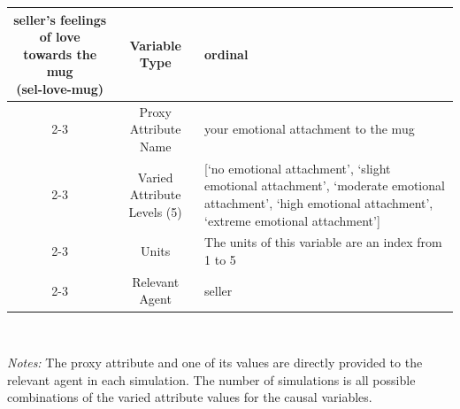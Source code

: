 \documentclass[12pt]{article}
\begin{document}
\begin{table}[ht]
\begin{tabularx}{\textwidth}{|c|c|X|}
\hline
\multirow{5}{*}{\parbox{5cm} { \centering seller's feelings of love towards the mug \\(sel-love-mug)}} & Variable Type & ordinal  \\ \cline{2-3}
                        & Proxy Attribute Name   & your emotional attachment to the mug   \\ \cline{2-3}
                        & Varied Attribute Levels (5)  & [`no emotional attachment', `slight emotional attachment', `moderate emotional attachment', `high emotional attachment', `extreme emotional attachment']   \\ \cline{2-3}
                        & Units  & The units of this variable are an index from 1 to 5   \\ \cline{2-3}
                        & Relevant Agent   & seller   \\ \hline
\end{tabularx}\\
    \begin{minipage}{\textwidth}
    \begin{footnotesize}
      \emph{Notes:} The proxy attribute and one of its values are directly provided to the relevant agent in each simulation.
      The number of simulations is all possible combinations of the varied attribute values for the causal variables.
    \end{footnotesize}
    \end{minipage}
\end{table}
\end{document}
